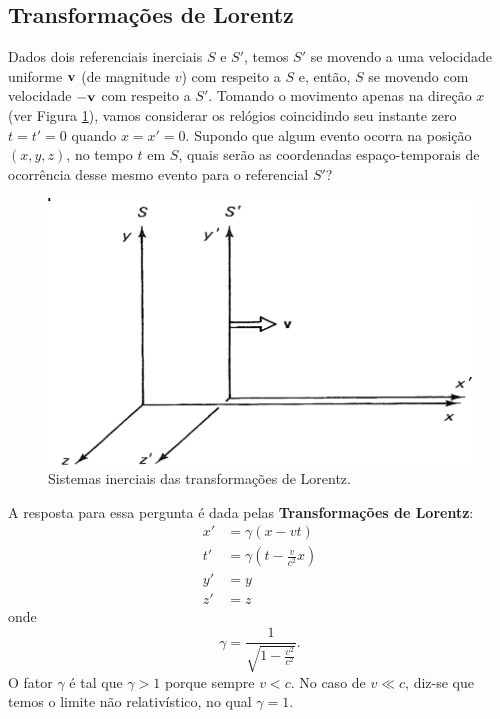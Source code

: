 \documentclass[12pt,a4paper,titlepage,brazil]{article}
\begin{document}

\subsection{Transformações de Lorentz}

Dados dois referenciais inerciais $S$ e $S'$, temos $S'$ se movendo a uma velocidade uniforme ${\bf v}$ (de magnitude $v$) com respeito a $S$ e, então, $S$ se movendo com velocidade $- {\bf v}$ com respeito a $S'$. Tomando o movimento apenas na direção $x$ (ver Figura \ref{fig:lorentz}), vamos considerar os relógios coincidindo seu instante zero $t = t' = 0$ quando $x = x' = 0$. Supondo que algum evento ocorra na posição $(x, y, z)$, no tempo $t$ em $S$, quais serão as coordenadas espaço-temporais de ocorrência desse mesmo evento para o referencial $S'$?

\begin{figure}[h!]
 \centering
 \includegraphics[scale=0.3]{figuras/lorentz.png}
 \caption{Sistemas inerciais das transformações de Lorentz.\label{fig:lorentz}}
\end{figure}

A resposta para essa pergunta é dada pelas {\bf Transformações de Lorentz}:
\begin{align}
 x' & = \gamma \left( x - v t \right) \label{eq:L1}\\
 t' & = \gamma \left( t - \frac{v}{c^2} x \right) \label{eq:L2}\\
 y' & = y \label{eq:L3}\\
 z' & = z \label{eq:L4}
\end{align}
onde
\begin{equation}
 \gamma = \frac{1}{\sqrt{1 - \frac{v^2}{c^2}}} .
\end{equation}
O fator $\gamma$ é tal que $\gamma > 1$ porque sempre $v < c$. No caso de $v \ll c$, diz-se que temos o limite não relativístico, no qual $\gamma = 1$.
\end{document}
